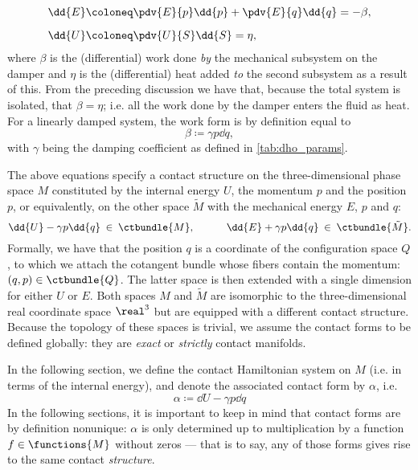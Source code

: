 \begin{equation}
    \begin{split}
        \dd{E} &\coloneq \pdv{E}{p}\dd{p} + \pdv{E}{q}\dd{q} = -\beta, \\[0.2cm]
        \dd{U} &\coloneq \pdv{U}{S}\dd{S} = \eta, \\
    \end{split}
\end{equation}
where $\beta$ is the (differential) work done \emph{by} the mechanical subsystem on the damper and $\eta$ is the (differential) heat added \emph{to} the second subsystem as a result of this. From the preceding discussion we have that, because the total system is isolated, that $ \beta = \eta $; i.e. all the work done by the damper enters the fluid as heat. For a linearly damped system, the work form is by definition equal to 
\begin{equation}
    \beta \coloneq \gamma p \dd{q},
    \label{eq:dho_work_form}
\end{equation}
with $\gamma$ being the damping coefficient as defined in \cref{tab:dho_params}. 

The above equations specify a contact structure on the three-dimensional phase space $M$ constituted by the internal energy $U$, the momentum $p$ and the position $p$, or equivalently, on the other space $\tilde{M}$ with the mechanical energy $E$, $p$ and $q$:
$$ \dd{U} - \gamma p \dd{q} \: \in \: \ctbundle{M}, \qquad \quad \dd{E} + \gamma p \dd{q} \: \in \: \ctbundle{\tilde{M}}. $$
Formally, we have that the position $q$ is a coordinate of the configuration space $Q$, to which we attach the cotangent bundle whose fibers contain the momentum: $ (q, p) \in \ctbundle{Q}$. The latter space is then extended with a single dimension for either $U$ or $E$. Both spaces $M$ and $\tilde{M}$ are isomorphic to the three-dimensional real coordinate space $\real^3$ but are equipped with a different contact structure. Because the topology of these spaces is trivial, we assume the contact forms to be defined globally: they are \emph{exact} or \emph{strictly} contact manifolds. %

In the following section, we define the contact Hamiltonian system on $M$ (i.e. in terms of the internal energy), and denote the associated contact form by $\alpha$, i.e.
\begin{equation}
    \alpha \coloneq \dd{U} - \gamma p \dd{q}
    \label{eq:dho_contact_form_thermo}
\end{equation}
In the following sections, it is important to keep in mind that contact forms are by definition nonunique: $\alpha$ is only determined up to multiplication by a function $f \in \functions{M}$ without zeros --- that is to say, any of those forms gives rise to the same contact \emph{structure}.

